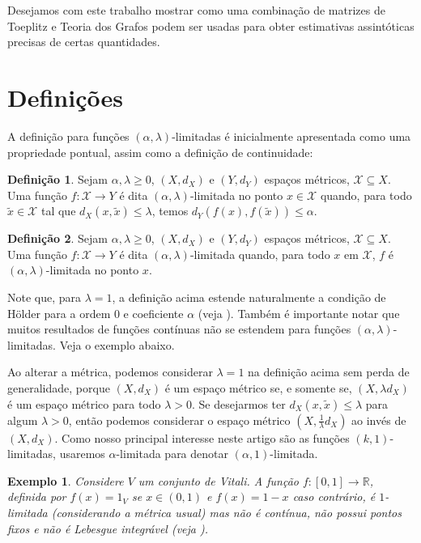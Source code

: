 \documentclass[a4paper,12pt]{article}
\newtheorem{example}{Exemplo}
\theoremstyle{definition}
\newtheorem{definition}{Definição}
\begin{document}
Desejamos com este trabalho mostrar como uma combinação de matrizes de Toeplitz e Teoria dos Grafos podem ser usadas para obter estimativas assintóticas precisas de certas quantidades.

\newpage
\section{Definições}
\vspace{1cm}
A definição para funções $(\alpha,\lambda)$-limitadas é inicialmente apresentada como uma propriedade pontual, assim como a definição de continuidade: \begin{definition} Sejam $\alpha, \lambda \ge 0$, $(X, d_X)$ e $(Y, d_Y)$ espaços métricos, $\mathcal{X} \subseteq X$. Uma função $f : \mathcal{X} \to Y$ é dita $(\alpha,\lambda)$-limitada no ponto $x \in \mathcal{X}$ quando, para todo $\tilde{x} \in \mathcal{X}$ tal que $d_X(x, \tilde{x}) \le \lambda$, temos $d_Y(f(x), f(\tilde{x})) \le \alpha$. \end{definition}

\begin{definition} Sejam $\alpha, \lambda \ge 0$, $(X, d_X)$ e $(Y, d_Y)$ espaços métricos, $\mathcal{X} \subseteq X$. Uma função $f : \mathcal{X} \to Y$ é dita $(\alpha,\lambda)$-limitada quando, para todo $x$ em $\mathcal{X}$, $f$ é $(\alpha,\lambda)$-limitada no ponto $x$. \end{definition}

Note que, para $\lambda = 1$, a definição acima estende naturalmente a condição de Hölder para a ordem $0$ e coeficiente $\alpha$ (veja \cite{holder}). Também é importante notar que muitos resultados de funções contínuas não se estendem para funções $(\alpha, \lambda)$-limitadas. Veja o exemplo abaixo.

Ao alterar a métrica, podemos considerar $\lambda = 1$ na definição acima sem perda de generalidade, porque $(X, d_X)$ é um espaço métrico se, e somente se, $(X, \lambda d_X)$ é um espaço métrico para todo $\lambda > 0$. Se desejarmos ter $d_X(x, \tilde{x}) \le \lambda$ para algum $\lambda > 0$, então podemos considerar o espaço métrico $(X, \frac{1}{\lambda} d_X)$ ao invés de $(X, d_X)$. Como nosso principal interesse neste artigo são as funções $(k,1)$-limitadas, usaremos $\alpha$-limitada para denotar $(\alpha,1)$-limitada.

\begin{example} Considere $V$ um conjunto de Vitali. A função $f : [0, 1] \to \mathbb{R}$, definida por $f(x) = 1_V$ se $x \in (0, 1)$ e $f(x) = 1 - x$ caso contrário, é $1$-limitada (considerando a métrica usual) mas não é contínua, não possui pontos fixos e não é Lebesgue integrável (veja \cite{vitali}). \end{example}
\end{document}
